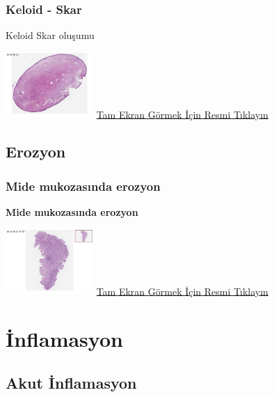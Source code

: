 \documentclass[
  letterpaper,
  DIV=11,
  numbers=noendperiod]{scrreprt}
\begin{document}
\hypertarget{sec-keloid-skar}{%
\section{Keloid - Skar}\label{sec-keloid-skar}}

Keloid Skar oluşumu

\href{https://images.patolojiatlasi.com/keloid-scar/HE.html}{\includegraphics[width=0.25\textwidth,height=\textheight]{./screenshots/thumbnail_keloid-scar.png}}
\href{https://images.patolojiatlasi.com/keloid-scar/HE.html}{Tam Ekran
Görmek İçin Resmi Tıklayın}

\hypertarget{sec-erozyon}{%
\chapter{Erozyon}\label{sec-erozyon}}

\hypertarget{sec-mide-mukozasinda-erozyon}{%
\section{Mide mukozasında erozyon}\label{sec-mide-mukozasinda-erozyon}}

\textbf{Mide mukozasında erozyon}

\href{https://images.patolojiatlasi.com/erosion/HE.html}{\includegraphics[width=0.25\textwidth,height=\textheight]{./screenshots/thumbnail_erosion.png}}
\href{https://images.patolojiatlasi.com/erosion/HE.html}{Tam Ekran
Görmek İçin Resmi Tıklayın}

\part{İnflamasyon}

\hypertarget{sec-akut-inflamasyon}{%
\chapter{Akut İnflamasyon}\label{sec-akut-inflamasyon}}
\end{document}
